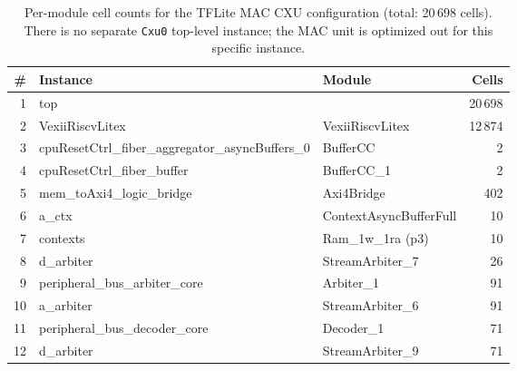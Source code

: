 \begin{table}[!htbp]
\centering
\caption{Per-module cell counts for the TFLite MAC CXU configuration (total: 20\,698 cells).
         There is no separate \texttt{Cxu0} top-level instance; the MAC unit is
         optimized out for this specific instance.}
\label{tab:area_tflite}
\small
\begin{tabular}{rllr}
\toprule
\textbf{\#} & \textbf{Instance} & \textbf{Module} & \textbf{Cells} \\
\midrule
1  & top                                                                 &                                                  & 20\,698 \\
2  & \quad VexiiRiscvLitex                                               & VexiiRiscvLitex                                  & 12\,874 \\
3  & \quad\quad cpuResetCtrl\_fiber\_aggregator\_asyncBuffers\_0         & BufferCC                                         &      2 \\
4  & \quad\quad cpuResetCtrl\_fiber\_buffer                              & BufferCC\_1                                      &      2 \\
5  & \quad\quad mem\_toAxi4\_logic\_bridge                               & Axi4Bridge                                       &    402 \\
6  & \quad\quad\quad a\_ctx                                              & ContextAsyncBufferFull                           &     10 \\
7  & \quad\quad\quad\quad contexts                                       & Ram\_1w\_1ra (p3)                                &     10 \\
8  & \quad\quad\quad d\_arbiter                                          & StreamArbiter\_7                                 &     26 \\
9  & \quad\quad peripheral\_bus\_arbiter\_core                           & Arbiter\_1                                       &     91 \\
10 & \quad\quad\quad a\_arbiter                                          & StreamArbiter\_6                                 &     91 \\
11 & \quad\quad peripheral\_bus\_decoder\_core                           & Decoder\_1                                       &     71 \\
12 & \quad\quad\quad d\_arbiter                                          & StreamArbiter\_9                                 &     71 \\

\end{tabular}
\end{table}
